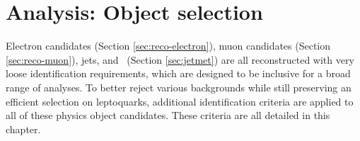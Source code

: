 \chapter{Analysis: Object selection}
\label{ch:analysis-object-selection}

Electron candidates (Section \ref{sec:reco-electron}),
muon candidates (Section \ref{sec:reco-muon}),
jets, and \met~(Section \ref{sec:jetmet}) are all reconstructed
with very loose identification requirements, which are designed
to be inclusive for a broad range of analyses.  
To better reject various backgrounds while still preserving an
efficient selection on leptoquarks, additional
identification criteria are applied to all of these physics object
candidates.  These criteria are all detailed in this chapter.
